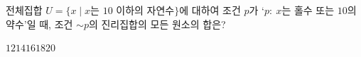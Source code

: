 전체집합 $U=\{x \mid x$는 $10$ 이하의 자연수$\}$에 대하여 조건 $p$가 `$p:\ x$는 홀수 또는 $10$의 약수'일 때, 조건 $\sim p$의 진리집합의 모든 원소의 합은?
\begin{choices32}{$12$}{$14$}{$16$}{$18$}{$20$}\end{choices32}
